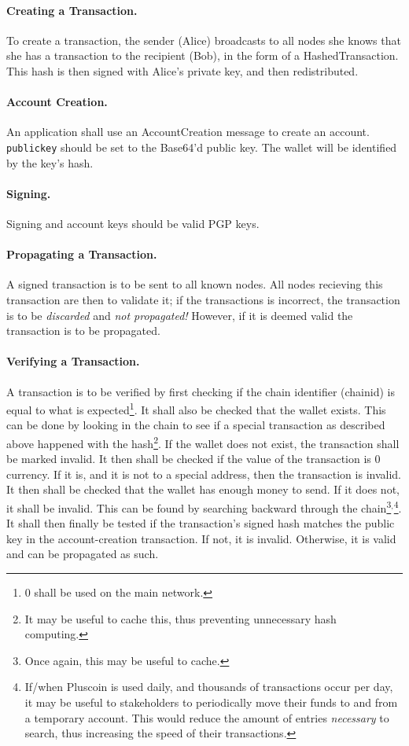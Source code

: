 \documentclass{article}
\begin{document}
\paragraph{Creating a Transaction.} To create a transaction, the sender (Alice)
broadcasts to all nodes she knows that she has a transaction to the recipient
(Bob), in the form of a HashedTransaction.  This hash is then signed with
Alice's private key, and then redistributed.

\paragraph{Account Creation.} An application shall use an AccountCreation
message to create an account. \verb|publickey| should be set to the Base64'd
public key. The wallet will be identified by the key's hash.

\paragraph{Signing.} Signing and account keys should be valid PGP keys.

\label{prop}
\paragraph{Propagating a Transaction.} A signed transaction is to be sent to all
known nodes. All nodes recieving this transaction are then to validate
it; if the transactions is incorrect, the transaction is to be {\it{discarded}}
and {\it{not propagated!}} However, if it is deemed valid the transaction is to
be propagated.

\paragraph{Verifying a Transaction.} A transaction is to be verified by first
checking if the chain identifier (chainid) is equal to what is
expected\footnote{$0$ shall be used on the main network.}. It shall also be
checked that the wallet exists.
This can be done by looking in the chain to see if a special transaction
as described above happened with the hash\footnote{It may be useful to cache
this, thus preventing unnecessary hash computing.}. If the wallet does not
exist, the transaction shall be marked invalid. It then shall be checked if the
value of the transaction is 0 currency. If it is, and it is not to
a special address, then the transaction is invalid. It then shall be checked
that the wallet has enough money to send. If it does not, it shall be invalid.
This can be found by searching backward through the chain\footnote{Once
again, this may be useful to cache.}$^,$\footnote{If/when Pluscoin is used
daily, and thousands of transactions occur per day, it may be useful to
stakeholders to periodically move their funds to and from a temporary account.
This would reduce the amount of entries {\it{necessary}} to search, thus
increasing the speed of their transactions.}. It shall then finally be tested
if the transaction's signed hash matches the public key in the account-creation
transaction. If not, it is invalid. Otherwise, it is valid and can be
propagated as such.
\end{document}
